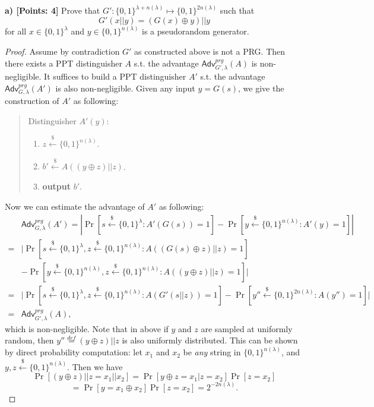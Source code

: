 \documentclass[12pt]{article}
\newcommand{\eqdef}{\stackrel{def}{=}}
\newcommand{\bits}{\{0,1\}}
\newcommand{\getsr}{\stackrel{\$}{\gets}}
\newcommand{\Adv}{\textsf{Adv}}
\theoremstyle{definition}
\begin{document}
{\bf a) [Points: 4]} Prove that $G' : \bits^{\lambda + n(\lambda)} \mapsto \bits^{2n(\lambda)}$ such that
$$G'(x||y) = (G(x)\oplus y)||y$$
for all $x\in\bits^\lambda$ and $y\in \bits^{n(\lambda)}$ is a pseudorandom generator.
\begin{proof}
Assume by contradiction $G'$ as constructed above is not a PRG. Then there exists a PPT distinguisher $A$ s.t. the advantage $\Adv_{G',\lambda}^{prg}(A)$ is non-negligible. It suffices to build a PPT distinguisher $A'$ s.t. the advantage $\Adv_{G,\lambda}^{prg}(A')$ is also non-negligible. Given any input $y = G(s)$, we give the construction of $A'$ as following:
\begin{quote}
Distinguisher $A'(y)$:
\begin{enumerate}
\item $z\getsr \bits^{n(\lambda)}$.
\item $b' \getsr A((y\oplus z)||z)$.
\item {\bf output} $b'$.
\end{enumerate}
\end{quote}
Now we can estimate the advantage of $A'$ as following:
$$
\begin{aligned}
&\Adv_{G,\lambda}^{prg}(A') = \left| \Pr[s\getsr\bits^\lambda : A'(G(s))=1] - \Pr[y\getsr\bits^{n(\lambda)} : A'(y)=1] \right| \\
=&\bigg| \Pr[s\getsr\bits^\lambda, z\getsr \bits^{n(\lambda)} : A((G(s)\oplus z)||z)=1]\\
 &- \Pr[y\getsr\bits^{n(\lambda)}, z\getsr \bits^{n(\lambda)} : A((y\oplus z)||z)=1] \bigg| \\
=&\bigg| \Pr[s\getsr\bits^\lambda, z\getsr \bits^{n(\lambda)} : A(G'(s||z))=1] - \Pr[y''\getsr\bits^{2n(\lambda)} : A(y'')=1] \bigg| \\
=&\Adv_{G',\lambda}^{prg}(A),
\end{aligned}
$$
which is non-negligible. Note that in above if $y$ and $z$ are sampled at uniformly random, then $y'' \eqdef (y\oplus z)||z$ is also uniformly distributed. This can be shown by direct probability computation: let $x_1$ and $x_2$ be \emph{any} string in $\bits^{n(\lambda)}$, and $y,z \getsr\bits^{n(\lambda)}$. Then we have
$$\Pr[(y\oplus z)||z = x_1||x_2] = \Pr[y\oplus z = x_1 | z=x_2]\Pr[z=x_2]$$
$$=\Pr[y = x_1\oplus x_2]\Pr[z=x_2] = 2^{-2n(\lambda)}.$$
\end{proof}
\end{document}
